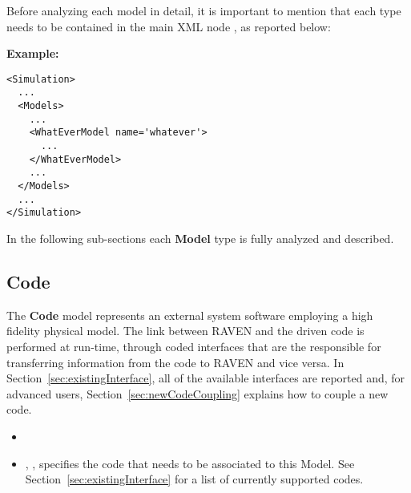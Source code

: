 Before analyzing each model in detail, it is important to mention that each
type needs to be contained in the main XML node , as reported
below:

\textbf{Example:}
\begin{lstlisting}[style=XML]
<Simulation>
  ...
  <Models>
    ...
    <WhatEverModel name='whatever'>
      ...
    </WhatEverModel>
    ...
  </Models>
  ...
</Simulation>
\end{lstlisting}
In the following sub-sections each \textbf{Model} type is fully analyzed and
described.
%
\subsection{Code}
\label{subsec:models_code}
The \textbf{Code} model represents an external system
software employing a high fidelity physical model.
%
The link between RAVEN and the driven code is performed at run-time, through
coded interfaces that are the responsible for transferring information from the
code to RAVEN and vice versa.
%
In Section~\ref{sec:existingInterface}, all of the available interfaces are
reported and, for advanced users, Section~\ref{sec:newCodeCoupling} explains how
to couple a new code.


%
\attrsIntro
%
\vspace{-5mm}
\begin{itemize}
  \itemsep0em
  \item \nameDescription
  \item {}, , specifies the
  code that needs to be associated to this Model.
  \nb See Section~\ref{sec:existingInterface} for a list of currently supported
  codes.
\end{itemize}
\vspace{-5mm}

